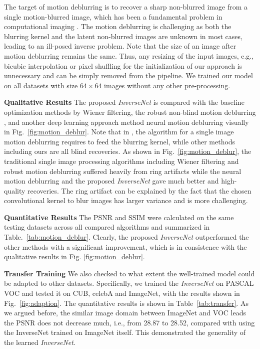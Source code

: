 \documentclass[10pt,twocolumn,letterpaper]{article}
\begin{document}
The target of motion deblurring is to recover a sharp non-blurred image from a single motion-blurred image, 
which has been a fundamental problem in computational imaging \cite{xu2010two}. The motion deblurring is challenging 
as both the blurring kernel and the latent non-blurred images are unknown in most cases, leading to an ill-posed inverse problem. 
Note that the size of an image after motion deblurring remains the same. Thus, any resizing of the input images, 
e.g., bicubic interpolation or pixel shuffling for the initialization of our approach is unnecessary and 
can be simply removed from the pipeline. We trained our model on all datasets with size $64 \times 64$ images 
without any other pre-processing. 

\textbf{Qualitative Results} The proposed \emph{InverseNet} is compared with the baseline optimization methods 
by Wiener filtering, the robust non-blind motion deblurring \cite{xu2010two}, and another deep learning approach method neural motion deblurring \cite{chakrabarti2016neural} visually in Fig.~\ref{fig:motion_deblur}. Note that in \cite{xu2010two}, 
the algorithm for a single image motion deblurring requires to feed the blurring kernel, while other methods 
including ours are all blind recoveries. As shown in Fig.~\ref{fig:motion_deblur}, the traditional single image 
processing algorithms including Wiener filtering and robust motion deblurring suffered heavily from ring artifacts
while the neural motion deblurring and the proposed \emph{InverseNet} gave much better and high-quality recoveries. 
The ring artifact can be explained by the fact that the chosen convolutional kernel to blur images has larger variance and is more challenging. 

\textbf{Quantitative Results} The PSNR and SSIM were calculated on the same testing datasets across all compared algorithms
and summarized in Table.~\ref{tab:motion_deblur}. Clearly, the proposed \emph{InverseNet} outperformed the other
methods with a significant improvement, which is in consistence with the qualitative results 
in Fig. \ref{fig:motion_deblur}. 

\textbf{Transfer Training}
We also checked to what extent the well-trained model could be adapted to other datasets. Specifically, we trained the \emph{InverseNet} on PASCAL VOC and tested it on CUB, celebA and ImageNet, with the results shown in Fig.~\ref{fig:adaption}. 
The quantitative results is shown in Table~\ref{tab:transfer}. As we argued before, the similar image domain between ImageNet and VOC leads the PSNR does not decrease much, i.e., from 28.87 to 28.52, compared with using the InverseNet trained on ImageNet itself. 
This demonstrated the generality of the learned \emph{InverseNet}.
\end{document}
